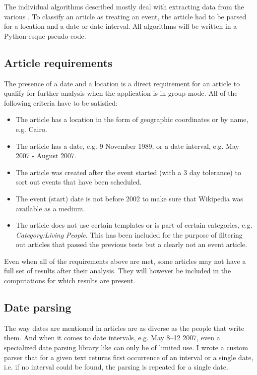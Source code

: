 The individual algorithms described mostly deal with extracting data from the various .
To classify an article as treating an event, the article had to be parsed for a location and a date or date interval.
All algorithms will be written in a Python-esque pseudo-code.

\subsection{Article requirements}

The presence of a date and a location is a direct requirement for an article to qualify for further analysis when the application is in group mode.
All of the following criteria have to be satisfied:

\begin{itemize}
  \item The article has a location in the form of geographic coordinates or by name, e.g. Cairo.
  \item The article has a date, e.g. 9 November 1989, or a date interval, e.g. May 2007 - August 2007.
  \item The article was created after the event started (with a 3 day tolerance) to sort out events that have been scheduled.
  \item The event (start) date is not before 2002 to make sure that Wikipedia was available as a medium. 
  \item The article does not use certain templates or is part of certain categories, e.g. \emph{Category:Living People}.
  This has been included for the purpose of filtering out articles that passed the previous tests but a clearly not an event article. 
\end{itemize}

Even when all of the requirements above are met, some articles may not have a full set of results after their analysis.
They will however be included in the computations for which results are present.

\subsection{Date parsing}

The way dates are mentioned in articles are as diverse as the people that write them.
And when it comes to date intervals, e.g. May 8--12 2007, even a specialized date parsing library like  can only be of limited use.
I wrote a custom parser that for a given text returns first occurrence of an interval or a single date, i.e. if no interval could be found, the parsing is repeated for a single date.


